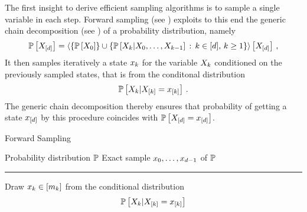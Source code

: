 
The first insight to derive efficient sampling algorithms is to sample a single variable in each step.
Forward sampling (see ) exploits to this end the generic chain decomposition (see ) of a probability distribution, namely
\begin{align*}
    \mathbb{P}\left[X_{[d]}\right] = \left\langle \{\mathbb{P}\left[X_{0}\right]\} \cup
    \left\{\mathbb{P}\left[X_{k}|X_{0},\ldots,X_{k-1}\right]\,:\,k\in[d], \, k\geq 1\right\}
    \right\rangle \left[ X_{[d]} \right] \, ,
\end{align*}
It then samples iteratively a state $x_{k}$ for the variable $X_{k}$ conditioned on the previously sampled states, that is from the conditonal distribution
\begin{align*}
    \mathbb{P}\left[X_{k}|X_{[k]}=x_{[k]}\right] \, .
\end{align*}
The generic chain decomposition thereby ensures that probability of getting a state $x_{[d]}$ by this procedure coincides with $\mathbb{P}\left[X_{[d]}=x_{[d]}\right]$.

\begin{algorithm}[hbt!]
    \caption{Forward Sampling}\label{alg:ForwardSampling}
    \begin{algorithmic}
        \Require Probability distribution $\mathbb{P}$
        \Ensure Exact sample $x_{0},\ldots,x_{d-1}$ of $\mathbb{P}$
        \hrule
        \For{$\catenumeratorin$}
            \State Draw $x_{k}\in[m_{k}]$ from the conditional distribution
            \begin{align*}
                \mathbb{P}\left[X_{k}|X_{[k]}=x_{[k]}\right]
            \end{align*}
        \EndFor
    \end{algorithmic}
\end{algorithm}

